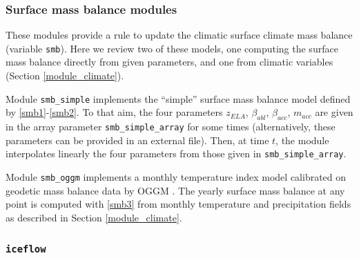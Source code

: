 \documentclass[10pt,twocolumn]{article}
\begin{document}
\subsubsection{Surface mass balance modules}
\label{module_smb}

These modules provide a rule to update the climatic surface climate mass balance
(variable \texttt{smb}). Here we review two of these models, one computing 
the surface mass balance directly from given parameters, and one from climatic 
variables (Section \ref{module_climate}).
 
Module \texttt{smb\_simple} implements the ``simple'' surface mass balance model
defined by \eqref{smb1}-\eqref{smb2}. To that aim, the four parameters 
$z_{ELA}$, $\beta_{abl}$, $\beta_{acc}$, $m_{acc}$ are given in the
array parameter \texttt{smb\_simple\_array} for some times
(alternatively, these parameters can be provided in an external file).
Then, at time $t$, the module interpolates linearly the four parameters 
from those given in \texttt{smb\_simple\_array}.
 
Module \texttt{smb\_oggm} implements a monthly temperature index model calibrated 
on geodetic mass balance data \citep{hugonnet2021accelerated} by OGGM \citep{maussion2019open}.
The yearly surface mass balance at any point is computed with \eqref{smb3} from 
monthly temperature and precipitation fields as described in Section \ref{module_climate}. 
 
\subsubsection{\texttt{iceflow}}
\label{module_iceflow}
\end{document}
